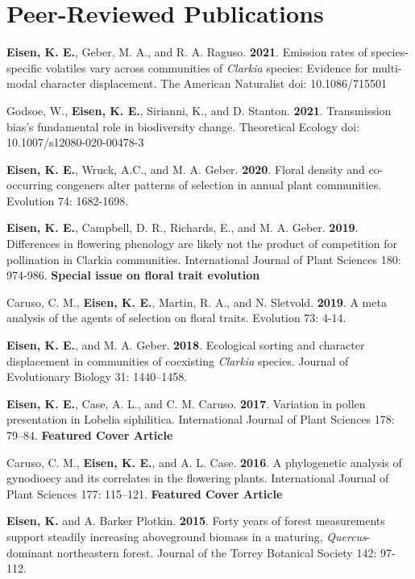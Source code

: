 \documentclass[letterpaper,11pt]{article}
\begin{document}
\section{Peer-Reviewed Publications}
\begin{etaremune}
\item \textbf{Eisen, K. E.}, Geber, M. A., and R. A. Raguso. \textbf{2021}. Emission rates of species-specific volatiles vary across communities of \textit{Clarkia} species: Evidence for multi-modal character displacement. The American Naturalist doi: 10.1086/715501\\
\item Godsoe, W., \textbf{Eisen, K. E.}, Sirianni, K., and D. Stanton. \textbf{2021}. Transmission bias's fundamental role in biodiversity change. Theoretical Ecology doi: 10.1007/s12080-020-00478-3 \\
\item \textbf{Eisen, K. E.}, Wruck, A.C., and M. A. Geber. \textbf{2020}. Floral density and co-occurring congeners alter patterns of selection in annual plant communities. Evolution 74: 1682-1698. \\
\item \textbf{Eisen, K. E.}, Campbell, D. R., Richards, E., and M. A. Geber. \textbf{2019}. Differences in flowering phenology are likely not the product of competition for pollination in Clarkia communities. International Journal of Plant Sciences 180: 974-986. \textbf{Special issue on floral trait evolution}\\
\item Caruso, C. M., \textbf{Eisen, K. E.}, Martin, R. A., and N. Sletvold. \textbf{2019}. A meta analysis of the agents of selection on floral traits. Evolution 73: 4-14.\\
\item \textbf{Eisen, K. E.}, and M. A. Geber. \textbf{2018}. Ecological sorting and character displacement in communities of coexisting \textit{Clarkia} species. Journal of Evolutionary Biology 31: 1440–1458.\\
\item \textbf{Eisen, K. E.}, Case, A. L., and C. M. Caruso. \textbf{2017}. Variation in pollen presentation in Lobelia siphilitica. International Journal of Plant Sciences 178: 79–84. \textbf{Featured Cover Article}\\
\item Caruso, C. M., \textbf{Eisen, K. E.}, and A. L. Case. \textbf{2016}. A phylogenetic analysis of gynodioecy and its correlates in the flowering plants. International Journal of Plant Sciences 177: 115–121. \textbf{Featured Cover Article}\\
\newpage
\vspace*{2mm}
\item \textbf{Eisen, K.} and A. Barker Plotkin. \textbf{2015}. Forty years of forest measurements support steadily increasing aboveground biomass in a maturing, \textit{Quercus}-dominant northeastern forest. Journal of the Torrey Botanical Society 142: 97-112.
\end{etaremune}
\end{document}
